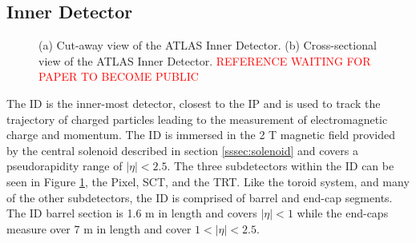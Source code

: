 	\subsection{Inner Detector}\label{ssec:ID}
		\begin{figure}[!ht]
		\centering
		\caption{\label{fig:ATLAS-ID} (a) Cut-away view of the \gls{ATLAS} Inner Detector. (b) Cross-sectional view of the ATLAS Inner Detector. \textcolor{red}{REFERENCE WAITING FOR PAPER TO BECOME PUBLIC}}
		\end{figure}

		The \gls{ID} is the inner-most detector, closest to the \gls{IP} and is used to track the trajectory of charged particles leading to the measurement of electromagnetic charge and momentum. The \gls{ID} is immersed in the 2 T magnetic field provided by the central solenoid described in section \ref{sssec:solenoid} and covers a pseudorapidity range of $|\eta|<2.5$. The three subdetectors within the \gls{ID} can be seen in Figure \ref{fig:ATLAS-ID}, the Pixel, \gls{SCT}, and the \gls{TRT}. Like the toroid system, and many of the other subdetectors, the \gls{ID} is comprised of barrel and end-cap segments. The \gls{ID} barrel section is 1.6 m in length and covers $|\eta|<1$ while the end-caps measure over 7 m in length and cover $1 < |\eta| < 2.5$. 

